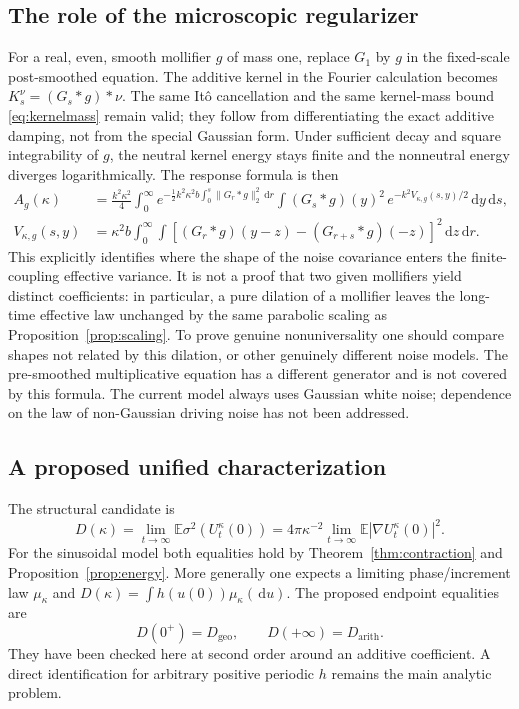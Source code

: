 \documentclass[11pt]{article}
\numberwithin{equation}{section}
\theoremstyle{definition}
\theoremstyle{remark}
\newcommand{\E}{\mathbb E}
\newcommand{\dd}{\,\mathrm d}
\newcommand{\Geo}{D_{\mathrm{geo}}}
\newcommand{\Arith}{D_{\mathrm{arith}}}
\begin{document}
\subsection{The role of the microscopic regularizer}
For a real, even, smooth mollifier $g$ of mass one, replace $G_1$ by $g$ in the fixed-scale post-smoothed equation. The additive kernel in the Fourier calculation becomes $K_s^\nu=(G_s*g)*\nu$. The same It\^o cancellation and the same kernel-mass bound \eqref{eq:kernelmass} remain valid; they follow from differentiating the exact additive damping, not from the special Gaussian form. Under sufficient decay and square integrability of $g$, the neutral kernel energy stays finite and the nonneutral energy diverges logarithmically. The response formula is then
\begin{align*}
 A_g(\kappa)&=\frac{k^2\kappa^2}{4}\int_0^\infty e^{-\frac12 k^2\kappa^2b\int_0^s\|G_r*g\|_2^2\dd r}
 \int (G_s*g)(y)^2\,e^{-k^2 V_{\kappa,g}(s,y)/2}\dd y\dd s,\\
 V_{\kappa,g}(s,y)&=\kappa^2b\int_0^\infty\int
 [(G_r*g)(y-z)-(G_{r+s}*g)(-z)]^2\dd z\dd r.
\end{align*}
This explicitly identifies where the shape of the noise covariance enters the finite-coupling effective variance. It is not a proof that two given mollifiers yield distinct coefficients: in particular, a pure dilation of a mollifier leaves the long-time effective law unchanged by the same parabolic scaling as Proposition~\ref{prop:scaling}. To prove genuine nonuniversality one should compare shapes not related by this dilation, or other genuinely different noise models. The pre-smoothed multiplicative equation has a different generator and is not covered by this formula. The current model always uses Gaussian white noise; dependence on the law of non-Gaussian driving noise has not been addressed.

\subsection{A proposed unified characterization}
The structural candidate is
\[
 D(\kappa)=\lim_{t\to\infty}\E\sigma^2(U_t^\kappa(0))
 =4\pi\kappa^{-2}\lim_{t\to\infty}\E|\nabla U_t^\kappa(0)|^2.
\]
For the sinusoidal model both equalities hold by Theorem~\ref{thm:contraction} and Proposition~\ref{prop:energy}. More generally one expects a limiting phase/increment law $\mu_\kappa$ and $D(\kappa)=\int h(u(0))\mu_\kappa(\dd u)$. The proposed endpoint equalities are
\[
 D(0^+)=\Geo,\qquad D(+\infty)=\Arith.
\]
They have been checked here at second order around an additive coefficient. A direct identification for arbitrary positive periodic $h$ remains the main analytic problem.
\end{document}
